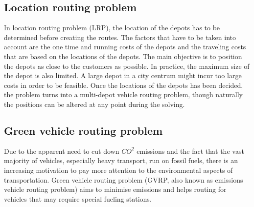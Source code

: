 \subsection{Location routing problem}

In location routing problem (LRP), the location of the depots has to be determined before creating the routes. The factors that have to be taken into account are the one time and running costs of the depots and the traveling costs that are based on the locations of the depots. The main objective is to position the depots as close to the customers as possible. In practice, the maximum size of the depot is also limited. A large depot in a city centrum might incur too large costs in order to be feasible. Once the locations of the depots has been decided, the problem turns into a multi-depot vehicle routing problem, though naturally the positions can be altered at any point during the solving. \cite{tuzun1999two}


\subsection{Green vehicle routing problem}

Due to the apparent need to cut down $CO^2$ emissions and the fact that the vast majority of vehicles, especially heavy transport, run on fossil fuels, there is an increasing motivation to pay more attention to the environmental aspects of transportation. Green vehicle routing problem (GVRP, also known as emissions vehicle routing problem) aims to minimise emissions and helps routing for vehicles that may require special fueling stations. \cite{erdougan2012green}



